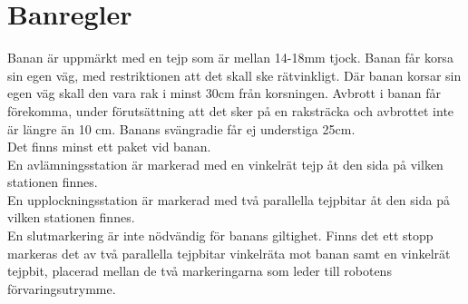 \section{Banregler} \label{banregler}

Banan är uppmärkt med en tejp som är mellan 14-18mm tjock. Banan får korsa sin egen väg, med restriktionen att det skall ske rätvinkligt. Där banan korsar sin egen väg skall den vara rak i minst 30cm från korsningen. Avbrott i banan får förekomma, under förutsättning att det sker på en raksträcka och avbrottet inte är längre än 10 cm. Banans svängradie får ej understiga 25cm. \\
Det finns minst ett paket vid banan. \\
En avlämningsstation är markerad med en vinkelrät tejp åt den sida på vilken stationen finnes. \\
En upplockningsstation är markerad med två parallella tejpbitar åt den sida på vilken stationen finnes. \\
En slutmarkering är inte nödvändig för banans giltighet. Finns det ett stopp markeras det av två parallella tejpbitar vinkelräta mot banan samt en vinkelrät tejpbit, placerad mellan de två markeringarna som leder till robotens förvaringsutrymme. \\

